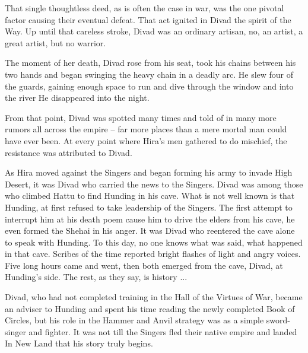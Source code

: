That single thoughtless deed, as is often the case in war, was the one pivotal factor causing their eventual defeat. That act ignited in Divad the spirit of the Way. Up until that careless stroke, Divad was an ordinary artisan, no, an artist, a great artist, but no warrior.

The moment of her death, Divad rose from his seat, took his chains between his two hands and began swinging the heavy chain in a deadly arc. He slew four of the guards, gaining enough space to run and dive through the window and into the river He disappeared into the night.

From that point, Divad was spotted many times and told of in many more rumors all across the empire -- far more places than a mere mortal man could have ever been. At every point where Hira's men gathered to do mischief, the resistance was attributed to Divad.

As Hira moved against the Singers and began forming his army to invade High Desert, it was Divad who carried the news to the Singers. Divad was among those who climbed Hattu to find Hunding in his cave. What is not well known is that Hunding, at first refused to take leadership of the Singers. The first attempt to interrupt him at his death poem cause him to drive the elders from his cave, he even formed the Shehai in his anger. It was Divad who reentered the cave alone to speak with Hunding. To this day, no one knows what was said, what happened in that cave. Scribes of the time reported bright flashes of light and angry voices. Five long hours came and went, then both emerged from the cave, Divad, at Hunding's side. The rest, as they say, is history ...

Divad, who had not completed training in the Hall of the Virtues of War, became an adviser to Hunding and spent his time reading the newly completed Book of Circles, but his role in the Hammer and Anvil strategy was as a simple sword-singer and fighter. It was not till the Singers fled their native empire and landed In New Land that his story truly begins.